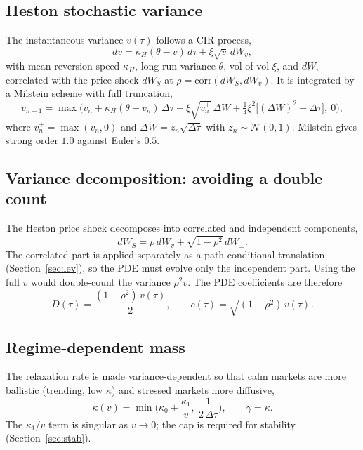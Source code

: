 \documentclass[11pt]{article}
\begin{document}
\subsection{Heston stochastic variance}

The instantaneous variance $v(\tau)$ follows a CIR process,
\begin{equation}
dv = \kappa_H(\theta - v)\,d\tau + \xi \sqrt{v}\,dW_v,
\end{equation}
with mean-reversion speed $\kappa_H$, long-run variance $\theta$,
vol-of-vol $\xi$, and $dW_v$ correlated with the price shock $dW_S$ at
$\rho = \mathrm{corr}(dW_S, dW_v)$. It is integrated by a Milstein scheme
with full truncation,
\begin{equation}
v_{n+1} = \max\!\Big(v_n + \kappa_H(\theta - v_n)\,\Delta\tau
  + \xi\sqrt{v_n^+}\,\Delta W
  + \tfrac{1}{4}\xi^2\big[(\Delta W)^2 - \Delta\tau\big],\ 0\Big),
\end{equation}
where $v_n^+ = \max(v_n, 0)$ and $\Delta W = z_n\sqrt{\Delta\tau}$ with
$z_n \sim \mathcal{N}(0,1)$. Milstein gives strong order $1.0$ against
Euler's $0.5$.

\subsection{Variance decomposition: avoiding a double count}
\label{sec:decomp}

The Heston price shock decomposes into correlated and independent
components,
\begin{equation}
dW_S = \rho\,dW_v + \sqrt{1-\rho^2}\,dW_\perp .
\end{equation}
The correlated part is applied separately as a path-conditional
translation (Section~\ref{sec:lev}), so the PDE must evolve only the
independent part. Using the full $v$ would double-count the variance
$\rho^2 v$. The PDE coefficients are therefore
\begin{equation}
D(\tau) = \frac{(1-\rho^2)\,v(\tau)}{2},
\qquad
c(\tau) = \sqrt{(1-\rho^2)\,v(\tau)} .
\label{eq:Dc}
\end{equation}

\subsection{Regime-dependent mass}

The relaxation rate is made variance-dependent so that calm markets are
more ballistic (trending, low $\kappa$) and stressed markets more diffusive,
\begin{equation}
\kappa(v) = \min\!\Big(\kappa_0 + \frac{\kappa_1}{v},\ \frac{1}{2\,\Delta\tau}\Big),
\qquad \gamma = \kappa .
\label{eq:kappa}
\end{equation}
The $\kappa_1/v$ term is singular as $v \to 0$; the cap is required for
stability (Section~\ref{sec:stab}).
\end{document}
